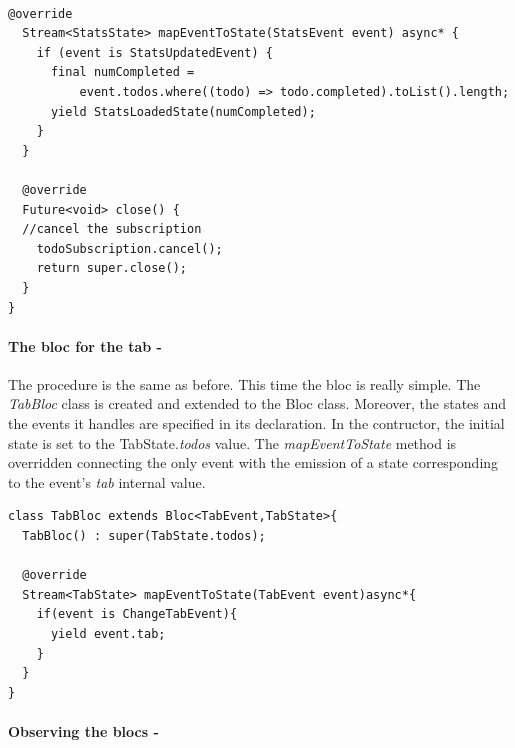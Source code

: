   \begin{code}
\mbox{}\\
 \mbox{}
\label{code:2.14}
\begin{verbatim}
@override
  Stream<StatsState> mapEventToState(StatsEvent event) async* {
    if (event is StatsUpdatedEvent) {
      final numCompleted =
          event.todos.where((todo) => todo.completed).toList().length;
      yield StatsLoadedState(numCompleted);
    }
  }

  @override
  Future<void> close() {
  //cancel the subscription
    todoSubscription.cancel();
    return super.close();
  }
}
\end{verbatim}
\mbox{}
\end{code}


\paragraph{The bloc for the tab - }
\label{subpar:todo_app_bloc_core_state}

The procedure is the same as before. This time the bloc is really simple.  The \textit{TabBloc }class is created and extended to the Bloc class. Moreover, the states and the events it handles are specified in its declaration.  In the contructor, the initial state is set to the TabState.\textit{todos} value. The \textit{mapEventToState} method is overridden connecting the only event with the emission of a state corresponding to the event's \textit{tab} internal value.

\begin{code}
\mbox{}
 \mbox{}
\label{code:2.14}
\begin{verbatim}
class TabBloc extends Bloc<TabEvent,TabState>{
  TabBloc() : super(TabState.todos);

  @override
  Stream<TabState> mapEventToState(TabEvent event)async*{
    if(event is ChangeTabEvent){
      yield event.tab;
    }
  }
}
\end{verbatim}
\mbox{}
\end{code}
\paragraph{Observing the blocs - }
\label{subpar:todo_app_bloc_core_state}


